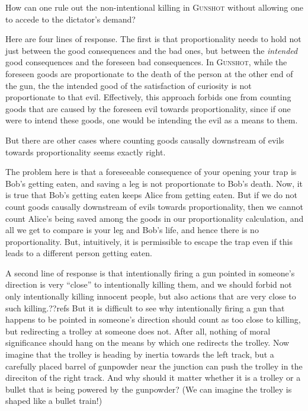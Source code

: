 How can one rule out the non-intentional killing in \textsc{Gunshot} without allowing one to accede to the dictator's demand? 

Here are four lines of response. The first is that proportionality needs to hold not just between the good consequences and
the bad ones, but between the \textit{intended} good consequences and the foreseen bad consequences. In \textsc{Gunshot},
while the foreseen goods are proportionate to the death of the person at the other end of the gun, the the intended good
of the satisfaction of curiosity is not proportionate to that evil. Effectively, this approach forbids one from counting
goods that are caused by the foreseen evil towards proportionality, since if one were to intend these goods, one would be
intending the evil as a means to them.

But there are other cases where counting goods causally downstream of evils towards proportionality seems exactly right. 

    
The problem here is that a foreseeable consequence of your opening your trap is Bob's getting eaten, and saving a leg is not
proportionate to Bob's death. Now, it is true that Bob's getting eaten keeps Alice from getting eaten. But if we do not count
goods causally downstream of evils towards proportionality, then we cannot count Alice's being saved among the goods in 
our proportionality calculation, and all we get to compare is your leg and Bob's life, and hence there is no proportionality.
But, intuitively, it is permissible to escape the trap even if this leads to a different person getting eaten.

A second line of response is that intentionally firing a gun pointed in someone's direction is very ``close'' to intentionally
killing them, and we should forbid not only intentionally killing innocent people, but also actions that are very close to such
killing.??refs But it is difficult to see why intentionally firing a gun that happens to be pointed in someone's direction should 
count as too close to killing, but redirecting a trolley at someone does not. After all, nothing of moral significance should
hang on the means by which one redirects the trolley. Now imagine that the trolley is heading by inertia towards the left 
track, but a carefully placed barrel of gunpowder near the junction can push the trolley in the direciton of the right track.
And why should it matter whether it is a trolley or a bullet that is being powered by the gunpowder? (We can imagine the
trolley is shaped like a bullet train!) 

